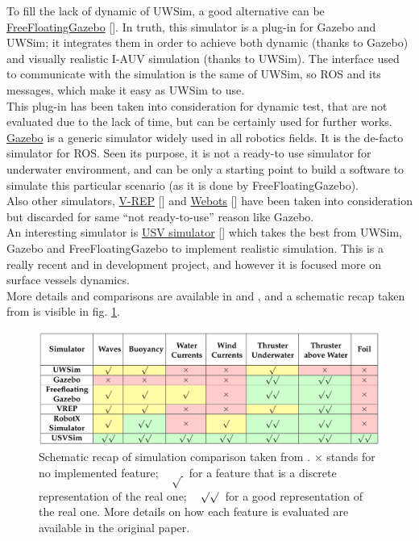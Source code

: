 To fill the lack of dynamic of UWSim, a good alternative can be \href{https://github.com/freefloating-gazebo/freefloating_gazebo}{FreeFloatingGazebo} [\cite{freeFloatingGazebo}]. In truth, this simulator is a plug-in for Gazebo and UWSim; it integrates them in order to achieve both dynamic (thanks to Gazebo) and visually realistic I-AUV simulation (thanks to UWSim). The interface used to communicate with the simulation is the same of UWSim, so ROS and its messages, which make it easy as UWSim to use. \\
This plug-in has been taken into consideration for dynamic test, that are not evaluated due to the lack of time, but can be certainly used for further works.
\href{http://gazebosim.org/}{Gazebo} is a generic simulator widely used in all robotics fields. It is the de-facto simulator for ROS. Seen its purpose, it is not a ready-to use simulator for underwater environment, and can be only a starting point to build a software to simulate this particular scenario (as it is done by FreeFloatingGazebo).\\
Also other simulators, \href{http://www.coppeliarobotics.com/index.html}{V-REP} [\cite{vrep}] and \href{https://cyberbotics.com/}{Webots} [\cite{webots}] have been taken into consideration but discarded for same \enquote{not ready-to-use} reason like Gazebo.\\
An interesting simulator is \href{https://github.com/disaster-robotics-proalertas/usv_sim_lsa}{USV simulator} [\cite{usvsim}] which takes the best from UWSim, Gazebo and FreeFloatingGazebo to implement realistic simulation. This is a really recent and in development project, and however it is focused more on surface vessels dynamics.\\

More details and comparisons are available in \cite{simComparisonCook} and \cite{usvsim}, and a schematic recap taken from \cite{usvsim} is visible in fig. \ref{fig:simComparison}.
\begin{figure}[H]
	\centering
	\includegraphics[width=14cm]{simComparison.png}
	\caption[Schematic Simulators Comparison]{Schematic recap of simulation comparison taken from \cite{usvsim}. $\times$ stands for no implemented feature; ~ $\surd\,$  for a feature that is a discrete representation of the real one; ~ $\surd\surd\,$ for a good representation of the real one. More details on how each feature is evaluated are available in the original paper.}
	\label{fig:simComparison}
\end{figure}

